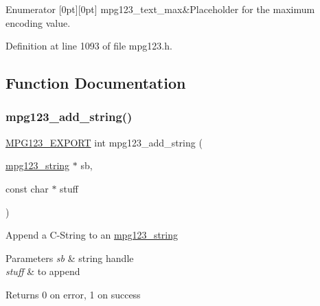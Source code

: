 \begin{DoxyEnumFields}{Enumerator}
[0pt][0pt]{}\mbox{\label{group__mpg123__metadata_gga489b4cd5fb8d1d826e38b09bed9294cea31f6a1326b0e255e708b2cf97cb2b15b}} 
mpg123\+\_\+text\+\_\+max&Placeholder for the maximum encoding value. \\
\hline

\end{DoxyEnumFields}


Definition at line 1093 of file mpg123.\+h.



\subsection{Function Documentation}
\mbox{\label{group__mpg123__metadata_gab54a099feebd65c5fa77d49a8c9c6db5}} 
\subsubsection{\texorpdfstring{mpg123\_add\_string()}{mpg123\_add\_string()}}
{\footnotesize\ttfamily \mbox{\hyperlink{mpg123_8h_a2ba98cfba3f760879df70e755b2a61cc}{M\+P\+G123\+\_\+\+E\+X\+P\+O\+RT}} int mpg123\+\_\+add\+\_\+string (\begin{DoxyParamCaption}\item[{\mbox{\hyperlink{structmpg123__string}{mpg123\+\_\+string}} $\ast$}]{sb,  }\item[{const char $\ast$}]{stuff }\end{DoxyParamCaption})}

Append a C-\/\+String to an \mbox{\hyperlink{structmpg123__string}{mpg123\+\_\+string}} 
\begin{DoxyParams}{Parameters}
{\em sb} & string handle \\
\hline
{\em stuff} & to append \\
\hline
\end{DoxyParams}
\begin{DoxyReturn}{Returns}
0 on error, 1 on success 
\end{DoxyReturn}
\mbox{\label{group__mpg123__metadata_ga76c2bf2ead81199a750ddff7253371f1}} 
